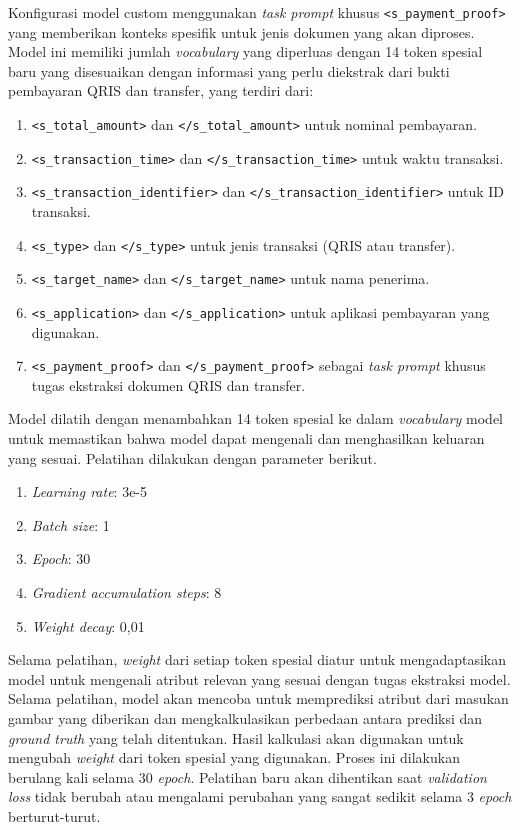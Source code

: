 Konfigurasi model custom menggunakan \emph{task prompt} khusus \texttt{<s\_payment\_proof>} yang memberikan konteks spesifik untuk jenis dokumen yang akan diproses. Model ini memiliki jumlah \emph{vocabulary} yang diperluas dengan 14 token spesial baru yang disesuaikan dengan informasi yang perlu diekstrak dari bukti pembayaran QRIS dan transfer, yang terdiri dari:
\begin{enumerate}
    \item \texttt{<s\_total\_amount>} dan \texttt{</s\_total\_amount>} untuk nominal pembayaran.
    \item \texttt{<s\_transaction\_time>} dan \texttt{</s\_transaction\_time>} untuk waktu transaksi.
    \item \texttt{<s\_transaction\_identifier>} dan \texttt{</s\_transaction\_identifier>} untuk ID transaksi.
    \item \texttt{<s\_type>} dan \texttt{</s\_type>} untuk jenis transaksi (QRIS atau transfer).
    \item \texttt{<s\_target\_name>} dan \texttt{</s\_target\_name>} untuk nama penerima.
    \item \texttt{<s\_application>} dan \texttt{</s\_application>} untuk aplikasi pembayaran yang digunakan.
    \item \texttt{<s\_payment\_proof>} dan \texttt{</s\_payment\_proof>} sebagai \emph{task prompt} khusus tugas ekstraksi dokumen QRIS dan transfer.
\end{enumerate}

Model dilatih dengan menambahkan 14 token spesial ke dalam \emph{vocabulary} model untuk memastikan bahwa model dapat mengenali dan menghasilkan keluaran yang sesuai. Pelatihan dilakukan dengan parameter berikut.
\begin{enumerate}
\item \emph{Learning rate}: 3e-5
\item \emph{Batch size}: 1
\item \emph{Epoch}: 30
\item \emph{Gradient accumulation steps}: 8
\item \emph{Weight decay}: 0,01
\end{enumerate}

Selama pelatihan, \emph{weight} dari setiap token spesial diatur untuk mengadaptasikan model untuk mengenali atribut relevan yang sesuai dengan tugas ekstraksi model. Selama pelatihan, model akan mencoba untuk memprediksi atribut dari masukan gambar yang diberikan dan mengkalkulasikan perbedaan antara prediksi dan \emph{ground truth} yang telah ditentukan. Hasil kalkulasi akan digunakan untuk mengubah \emph{weight} dari token spesial yang digunakan. Proses ini dilakukan berulang kali selama 30 \emph{epoch}. Pelatihan baru akan dihentikan saat \emph{validation loss} tidak berubah atau mengalami perubahan yang sangat sedikit selama 3 \emph{epoch} berturut-turut.

